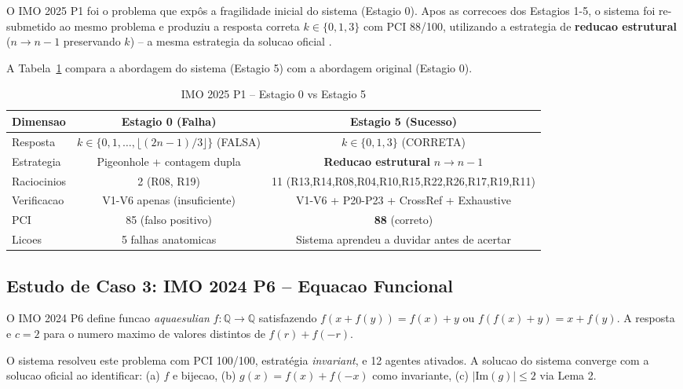 \documentclass[5p]{elsarticle}
\begin{document}
O IMO 2025 P1 \cite{imo2025} foi o problema que expôs a fragilidade inicial do
sistema (Estagio 0). Apos as correcoes dos Estagios 1-5, o sistema foi
re-submetido ao mesmo problema e produziu a resposta correta $k\in\{0,1,3\}$
com PCI 88/100, utilizando a estrategia de \textbf{reducao estrutural}
($n\to n-1$ preservando $k$) -- a mesma estrategia da solucao oficial
\cite{chen2025,deepmind2025}.

A Tabela~\ref{tab:imo2025compare} compara a abordagem do sistema (Estagio 5)
com a abordagem original (Estagio 0).

\begin{table}[H]
 \centering
 \caption{IMO 2025 P1 -- Estagio 0 vs Estagio 5}
 \label{tab:imo2025compare}
 \footnotesize
 \begin{tabular}{lcc}
 \toprule
 \textbf{Dimensao} & \textbf{Estagio 0 (Falha)} & \textbf{Estagio 5 (Sucesso)}\\
 \midrule
 Resposta & $k\in\{0,1,\dots,\lfloor(2n-1)/3\rfloor\}$ (FALSA) & $k\in\{0,1,3\}$ (CORRETA)\\
 Estrategia & Pigeonhole + contagem dupla & \textbf{Reducao estrutural} $n\to n-1$\\
 Raciocinios & 2 (R08, R19) & 11 (R13,R14,R08,R04,R10,R15,R22,R26,R17,R19,R11)\\
 Verificacao & V1-V6 apenas (insuficiente) & V1-V6 + P20-P23 + CrossRef + Exhaustive\\
 PCI & 85 (falso positivo) & \textbf{88} (correto)\\
 Licoes & 5 falhas anatomicas & Sistema aprendeu a duvidar antes de acertar\\
 \bottomrule
 \end{tabular}
\end{table}

\subsection{Estudo de Caso 3: IMO 2024 P6 -- Equacao Funcional}

O IMO 2024 P6 \cite{imo2024} define funcao \textit{aquaesulian} $f:\mathbb{Q}\to\mathbb{Q}$
satisfazendo $f(x+f(y))=f(x)+y$ ou $f(f(x)+y)=x+f(y)$. A resposta e $c=2$ para
o numero maximo de valores distintos de $f(r)+f(-r)$.

O sistema resolveu este problema com PCI 100/100, estratégia \textit{invariant},
e 12 agentes ativados. A solucao do sistema converge com a solucao oficial
\cite{deepmind2025} ao identificar: (a) $f$ e bijecao, (b) $g(x)=f(x)+f(-x)$
como invariante, (c) $|\text{Im}(g)|\leq 2$ via Lema 2.
\end{document}
